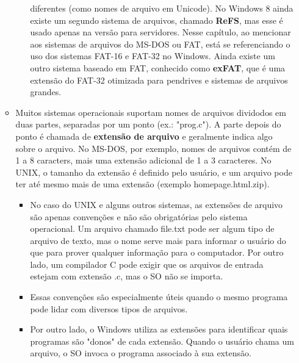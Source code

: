 \documentclass[10pt]{article}
\begin{document}
\begin{itemize}
\begin{itemize}
\begin{itemize}
            diferentes (como nomes de arquivo em Unicode). No Windows 8 ainda existe um
            segundo sistema de arquivos, chamado \textbf{ReFS}, mas esse é usado apenas
            na versão para servidores. Nesse capítulo, ao mencionar aos sistemas de arquivos
            do MS-DOS ou FAT, está se referenciando o uso dos sistemas FAT-16 e FAT-32 no 
            Windows. Ainda existe um outro sistema baseado em FAT, conhecido como \textbf{exFAT},
            que é uma extensão do FAT-32 otimizada para pendrives e sistemas de arquivos grandes.
        \end{itemize}
        \item Muitos sistemas operacionais suportam nomes de arquivos dividodos em duas partes,
        separadas por um ponto (ex.: "prog.c"). A parte depois do ponto é chamada de 
        \textbf{extensão de arquivo} e geralmente indica algo sobre o arquivo. No MS-DOS, por
        exemplo, nomes de arquivos contém de 1 a 8 caracters, mais uma extensão adicional de
        1 a 3 caracteres. No UNIX, o tamanho da extensão é definido pelo usuário, e um arquivo
        pode ter até mesmo mais de uma extensão (exemplo homepage.html.zip).
        \begin{itemize}
            \item No caso do UNIX e alguns outros sistemas, as extensões de arquivo são apenas
            convenções e não são obrigatórias pelo sistema operacional. Um arquivo chamado
            file.txt pode ser algum tipo de arquivo de texto, mas o nome serve mais
            para informar o usuário do que para prover qualquer informação para o computador.
            Por outro lado, um compilador C pode exigir que os arquivos de entrada estejam 
            com extensão .c, mas o SO não se importa.
            \item Essas convenções são especialmente úteis quando o mesmo programa pode 
            lidar com diversos tipos de arquivos.
            \item Por outro lado, o Windows utiliza as extensões para identificar quais programas
            são "donos" de cada extensão. Quando o usuário chama um arquivo, o SO invoca o programa
            associado à sua extensão.
        \end{itemize}
    \end{itemize}
\end{itemize}
\end{document}
